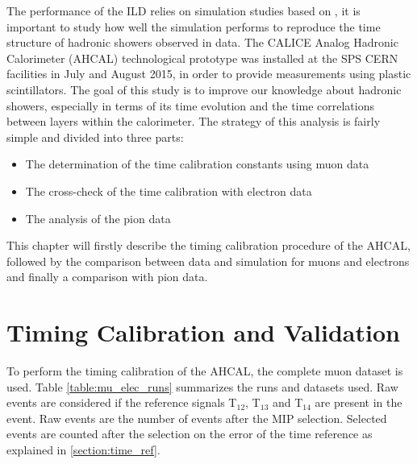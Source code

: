The performance of the ILD relies on simulation studies based on \geant, it is important to study how well the simulation performs to reproduce the time structure of hadronic showers observed in data. The CALICE Analog Hadronic Calorimeter (AHCAL) technological prototype was installed at the SPS CERN facilities in July and August 2015, in order to provide measurements using plastic scintillators. The goal of this study is to improve our knowledge about hadronic showers, especially in terms of its time evolution and the time correlations between layers within the calorimeter. The strategy of this analysis is fairly simple and divided into three parts:
\begin{itemize}
	\item The determination of the time calibration constants using muon data
	\item The cross-check of the time calibration with electron data
	\item The analysis of the pion data
\end{itemize}
This chapter will firstly describe the timing calibration procedure of the AHCAL, followed by the comparison between data and simulation for muons and electrons and finally a comparison with pion data.

\chapter{Timing Calibration and Validation}

To perform the timing calibration of the AHCAL, the complete muon dataset is used. Table \ref{table:mu_elec_runs} summarizes the runs and datasets used. Raw events are considered if the reference signals T$_{12}$,  T$_{13}$ and T$_{14}$ are present in the event. Raw events are the number of events after the MIP selection. Selected events are counted after the selection on the error of the time reference as explained in \ref{section:time_ref}.

\begin{table}[htb!]
	\centering
	\caption{Table with the run statistic before and after selection used for timing calibration.}
	\label{table:mu_elec_runs}
\end{table}

